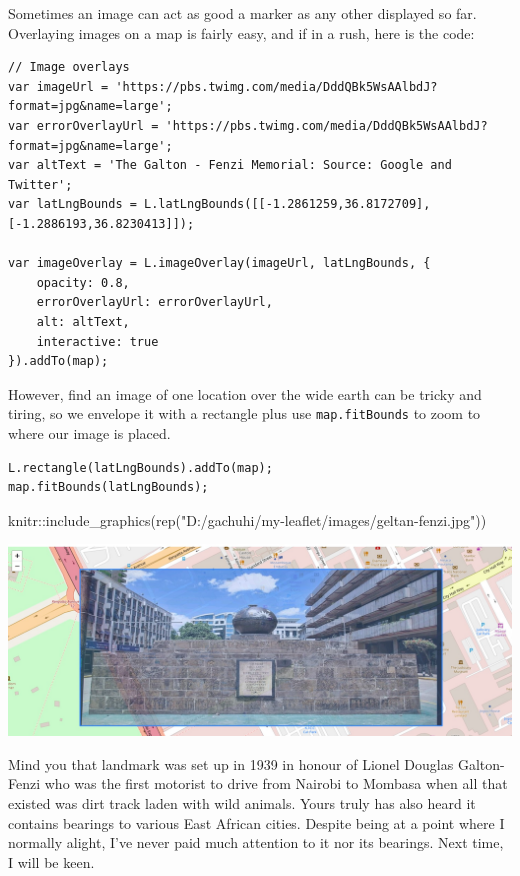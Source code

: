 \documentclass[
]{book}
\newenvironment{Shaded}{\begin{snugshade}}{\end{snugshade}}
\newcommand{\FunctionTok}[1]{\textcolor[rgb]{0.00,0.00,0.00}{#1}}
\newcommand{\NormalTok}[1]{#1}
\newcommand{\SpecialCharTok}[1]{\textcolor[rgb]{0.00,0.00,0.00}{#1}}
\newcommand{\StringTok}[1]{\textcolor[rgb]{0.31,0.60,0.02}{#1}}
\begin{document}
Sometimes an image can act as good a marker as any other displayed so far. Overlaying images on a map is fairly easy, and if in a rush, here is the code:

\begin{verbatim}
// Image overlays
var imageUrl = 'https://pbs.twimg.com/media/DddQBk5WsAAlbdJ?format=jpg&name=large';
var errorOverlayUrl = 'https://pbs.twimg.com/media/DddQBk5WsAAlbdJ?format=jpg&name=large';
var altText = 'The Galton - Fenzi Memorial: Source: Google and Twitter';
var latLngBounds = L.latLngBounds([[-1.2861259,36.8172709], [-1.2886193,36.8230413]]);

var imageOverlay = L.imageOverlay(imageUrl, latLngBounds, {
    opacity: 0.8,
    errorOverlayUrl: errorOverlayUrl,
    alt: altText,
    interactive: true
}).addTo(map);

\end{verbatim}

However, find an image of one location over the wide earth can be tricky and tiring, so we envelope it with a rectangle plus use \texttt{map.fitBounds} to zoom to where our image is placed.

\begin{verbatim}
L.rectangle(latLngBounds).addTo(map);
map.fitBounds(latLngBounds);
\end{verbatim}

\begin{Shaded}
\begin{Highlighting}[]
\NormalTok{knitr}\SpecialCharTok{::}\FunctionTok{include\_graphics}\NormalTok{(}\FunctionTok{rep}\NormalTok{(}\StringTok{"D:/gachuhi/my{-}leaflet/images/geltan{-}fenzi.jpg"}\NormalTok{))}
\end{Highlighting}
\end{Shaded}

\includegraphics[width=25.97in]{../images/geltan-fenzi}

Mind you that landmark was set up in 1939 in honour of Lionel Douglas Galton-Fenzi who was the first motorist to drive from Nairobi to Mombasa when all that existed was dirt track laden with wild animals. Yours truly has also heard it contains bearings to various East African cities. Despite being at a point where I normally alight, I've never paid much attention to it nor its bearings. Next time, I will be keen.
\end{document}

